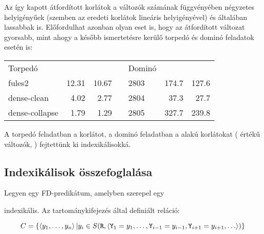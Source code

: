 Az így kapott átfordított korlátok a változók számának függvényében négyzetes
helyigényűek (szemben az eredeti korlátok lineáris helyigényével) és általában lassabbak
is. Előfordulhat azonban olyan eset is, hogy az átfordított változat gyorsabb, mint
ahogy a később ismertetésre kerülő torpedó és dominó feladatok esetén is:

\br

\begin{center}\begin{tabular}{|l|r|r|c|l|r|r|}
\cline{1-3}\cline{5-7}
Torpedó        & \cd{:-} & \cd{+:} & \hspace{0.5cm} & Dominó & \cd{:-} & \cd{+:} \\
\cline{1-3}\cline{5-7}
fules2         & 12.31   & 10.67   & \hspace{0.5cm} &   2803 &   174.7 & 127.6 \\
dense-clean    &  4.02   &  2.77   & \hspace{0.5cm} &   2804 &    37.3 &  27.7 \\
dense-collapse &  1.79   &  1.29   & \hspace{0.5cm} &   2805 &   327.7 & 239.8 \\
\cline{1-3}\cline{5-7}
\end{tabular}\end{center}
\br

A torpedó feladatban a  korlátot, a dominó feladatban a
 alakú korlátokat ( értékű változók, )
fejtettünk ki indexikálisokká.

\subsection{Indexikálisok összefoglalása}

Legyen  egy FD-predikátum, amelyben szerepel egy
\begin{center}
\end{center}
indexikális. Az  tartománykifejezés által definiált reláció:

\[ C = \{ \left\langle y_1, \ldots, y_n\right\rangle |  y_i \in S(\texttt{R},\left\langle{\tt
Y}_1=y_1,
 \ldots, \texttt{Y}_{i-1}=y_{i-1}, \texttt{Y}_{i+1}=y_{i+1},  \ldots \right\rangle)\}\]

